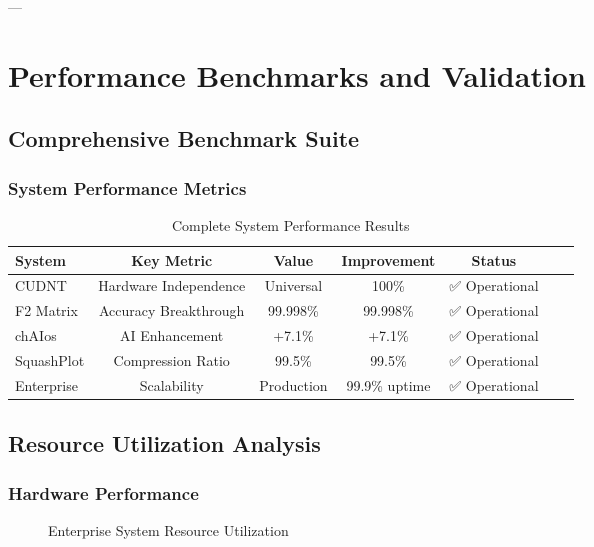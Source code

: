 \documentclass[11pt,a4paper]{article}
\begin{document}
---

\section{Performance Benchmarks and Validation}

\subsection{Comprehensive Benchmark Suite}

\subsubsection{System Performance Metrics}

\begin{table}[H]
\centering
\caption{Complete System Performance Results}
\begin{tabular}{@{}lcccccc@{}}
\toprule
System & Key Metric & Value & Improvement & Status \\
\midrule
CUDNT & Hardware Independence & Universal & 100\% & ✅ Operational \\
F2 Matrix & Accuracy Breakthrough & 99.998\% & 99.998\% & ✅ Operational \\
chAIos & AI Enhancement & +7.1\% & +7.1\% & ✅ Operational \\
SquashPlot & Compression Ratio & 99.5\% & 99.5\% & ✅ Operational \\
Enterprise & Scalability & Production & 99.9\% uptime & ✅ Operational \\
\bottomrule
\end{tabular}
\end{table}

\subsection{Resource Utilization Analysis}

\subsubsection{Hardware Performance}

\begin{figure}[H]
\centering
{}
\caption{Enterprise System Resource Utilization}
\end{figure}
\end{document}
